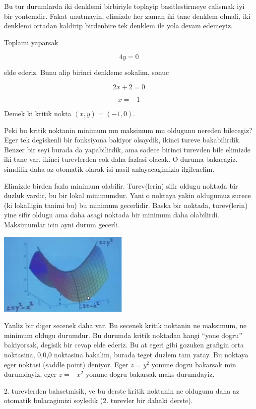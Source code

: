 \documentclass[12pt,fleqn]{article}\usepackage{../common}
\begin{document}
Bu tur durumlarda iki denklemi birbiriyle toplayip basitlestirmeye calismak
iyi bir yontemdir. Fakat unutmayin, elimizde her zaman iki tane denklem
olmali, iki denklemi ortadan kaldirip birdenbire tek denklem ile yola devam
edemeyiz. 

Toplami yaparsak

\[ 4y = 0 \]

elde ederiz. Bunu alip birinci denkleme sokalim, sonuc

\[ 2x + 2 = 0 \]

\[ x = -1 \]

Demek ki kritik nokta $(x,y) = (-1,0)$. 

Peki bu kritik noktanin minimum mu maksimum mu oldugunu nereden bilecegiz?
Eger tek degiskenli bir fonksiyona bakiyor olsaydik, ikinci tureve
bakabilirdik. Benzer bir seyi burada da yapabilirdik, ama sadece birinci
turevden bile elimizde iki tane var, ikinci turevlerden cok daha fazlasi
olacak. O duruma bakacagiz, simdilik daha az otomatik olarak isi nasil
anlayacagimizla ilgilenelim. 

Elimizde birden fazla minimum olabilir. Turev(lerin) sifir oldugu noktada
bir duzluk vardir, bu bir lokal minimumdur. Yani o noktaya yakin oldugumuz
surece (ki lokalligin tanimi bu) bu minimum gecerlidir. Baska bir noktada,
turev(lerin) yine sifir oldugu ama daha asagi noktada bir minimum daha
olabilirdi. Maksimumlar icin ayni durum gecerli.

\includegraphics[height=4cm]{9_4.png}

Yanliz bir diger secenek daha var. Bu secenek kritik noktanin ne maksimum,
ne minimum oldugu durumdur. Bu durumda kritik noktadan hangi ``yone dogru''
bakiyorsak, degisik bir cevap elde ederiz. Bu at egeri gibi gozuken
grafigin orta noktasina, 0,0,0 noktasina bakalim, burada teget duzlem tam
yatay. Bu noktaya eger noktasi (saddle point) deniyor. Eger $z=y^2$ yonune
dogru bakarsak min durumdayiz, eger $z=-x^2$ yonune dogru bakarsak maks
durumdayiz. 

2. turevlerden bahsetmisik, ve bu derste kritik noktanin ne oldugunu daha
az otomatik bulacagimizi soyledik (2. turevler bir dahaki derste). 
\end{document}
